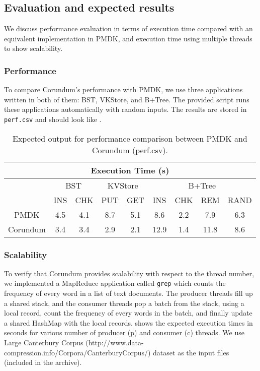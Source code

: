 {\subsection{Evaluation and expected results}

We discuss performance evaluation in terms of execution time compared with an equivalent implementation in PMDK, and execution time using multiple threads to show scalability. 

\subsubsection{Performance}

To compare Corundum's performance with PMDK, we use three applications written in both of them: BST, VKStore, and B+Tree. The provided script runs these applications automatically with random inputs. The results are stored in \verb+perf.csv+ and should look like .

\begin{table}
  \center
  \small
  \setlength\tabcolsep{1.5pt}
  \begin{tabular}{|c|c|c|c|c|c|c|c|c|} \hline
    \multicolumn{9}{|c|}{Execution Time (s)}	\\ \hline						
    & \multicolumn{2}{|c|}{BST}	& \multicolumn{2}{|c|}{KVStore}&\multicolumn{4}{|c|}{B+Tree}	\\ \hline	
    & INS&CHK&PUT&GET&INS&CHK&REM&RAND\\ \hline
    PMDK&4.5&4.1&8.7&5.1&8.6&2.2&7.9&6.3\\\hline
    Corundum&3.4&3.4&2.9&2.1&12.9&1.4&11.8&8.6\\\hline
  \end{tabular}
  \caption{Expected output for performance comparison between PMDK and Corundum (perf.csv).}
  \label{tbl:perf}
\end{table}


\subsubsection{Scalability}
To verify that Corundum provides scalability with respect to the thread number, we implemented a MapReduce application called \verb+grep+ which counts the frequency of every word in a list of text documents. The producer threads fill up a shared stack, and the consumer threads pop a batch from the stack, using a local record, count the frequency of every words in the batch, and finally update a shared HashMap with the local records.  shows the expected execution times in seconds for various number of producer (p) and consumer (c) threads. We use Large Canterbury Corpus (http://www.data-compression.info/Corpora/CanterburyCorpus/) dataset as the input files (included in the archive).

}
